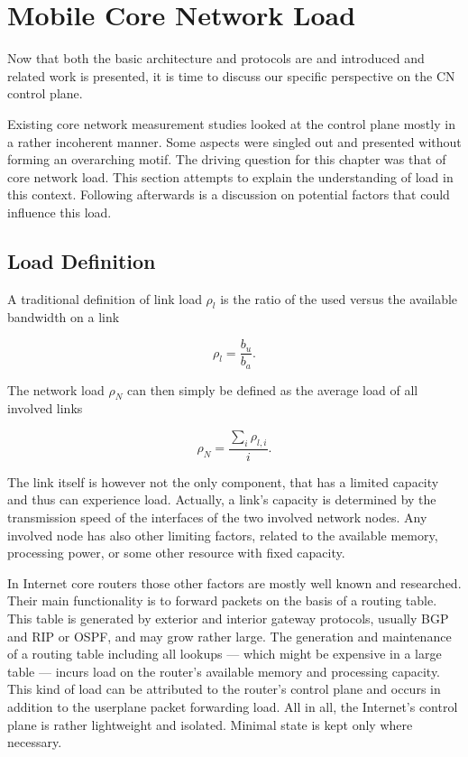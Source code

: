 \section{Mobile Core Network Load}
\label{c4:loaddefinition}

Now that both the basic architecture and protocols are and introduced and related work is presented, it is time to discuss our specific perspective on the \gls{CN} control plane.

Existing core network measurement studies looked at the control plane mostly in a rather incoherent manner. Some aspects were singled out and presented without forming an overarching motif. The driving question for this chapter was that of core network load. This section attempts to explain the understanding of load in this context. Following afterwards is a discussion on potential factors that could influence this load.


\subsection{Load Definition}

A traditional definition of link load $\rho_{l}$ is the ratio of the used versus the available bandwidth on a link

\begin{equation}
\rho_{l} = \frac{b_{u}}{b_{a}}\text{.}
\end{equation}

The network load $\rho_{N}$ can then simply be defined as the average load of all involved links

\begin{equation}
\rho_{N} = \frac{\sum_{i} \rho_{l,i}}{i}\text{.}
\end{equation}

The link itself is however not the only component, that has a limited capacity and thus can experience load. Actually, a link's capacity is determined by the transmission speed of the interfaces of the two involved network nodes. Any involved node has also other limiting factors, related to the available memory, processing power, or some other resource with fixed capacity.

In Internet core routers those other factors are mostly well known and researched. Their main functionality is to forward packets on the basis of a routing table. This table is generated by exterior and interior gateway protocols, usually \gls{BGP} and \gls{RIP} or \gls{OSPF}, and may grow rather large. The generation and maintenance of a routing table including all lookups --- which might be expensive in a large table --- incurs load on the router's available memory and processing capacity. This kind of load can be attributed to the router's control plane and occurs in addition to the userplane packet forwarding load. All in all, the Internet's control plane is rather lightweight and isolated. Minimal state is kept only where necessary.

